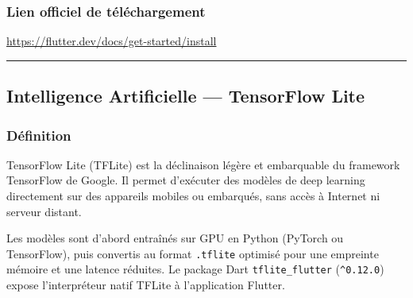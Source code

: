 \documentclass[12pt,a4paper]{report}
\begin{document}
\subsubsection*{Lien officiel de téléchargement}
\url{https://flutter.dev/docs/get-started/install}

\medskip\hrule\medskip

\subsection{Intelligence Artificielle --- TensorFlow Lite}

\noindent\begin{minipage}[t]{0.66\textwidth}
\subsubsection*{Définition}
TensorFlow Lite (TFLite) est la déclinaison légère et embarquable du framework TensorFlow de Google. Il permet d'exécuter des modèles de deep learning directement sur des appareils mobiles ou embarqués, sans accès à Internet ni serveur distant.

Les modèles sont d'abord entraînés sur GPU en Python (PyTorch ou TensorFlow), puis convertis au format \texttt{.tflite} optimisé pour une empreinte mémoire et une latence réduites. Le package Dart \texttt{tflite\_flutter} (\texttt{\^{}0.12.0}) expose l'interpréteur natif TFLite à l'application Flutter.
\end{minipage}\hfill
\begin{minipage}[t]{0.30\textwidth}
\vspace{0pt}
\begin{center}
\end{center}
\end{minipage}
\end{document}
